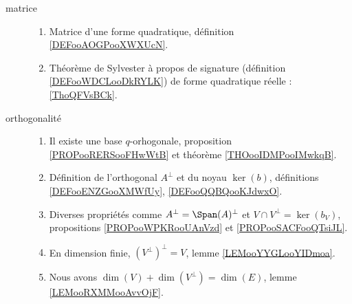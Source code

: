 \begin{description}
	\item[matrice]\hspace{1cm}
	\begin{enumerate}
		\item
		      Matrice d'une forme quadratique, définition \ref{DEFooAOGPooXWXUcN}.
		\item
		      Théorème de Sylvester à propos de signature (définition \ref{DEFooWDCLooDkRYLK}) de forme quadratique réelle : \ref{ThoQFVsBCk}.
	\end{enumerate}
	\item[orthogonalité]\hspace{1cm}
	\begin{enumerate}
		\item
		      Il existe une base \( q\)-orhogonale, proposition \ref{PROPooRERSooFHwWtB} et théorème \ref{THOooIDMPooIMwkqB}.
		\item
		      Définition de l'orthogonal \( A^{\perp}\) et du noyau \( \ker(b)\), définitions \ref{DEFooENZGooXMWfUy}, \ref{DEFooQQBQooKJdwxO}.
		\item
		      Diverses propriétés comme \( A^{\perp}=\Span(A)^{\perp}\) et \( V\cap V^{\perp}=\ker(b_V)\), propositions \ref{PROPooWPKRooUAnVzd} et \ref{PROPooSACFooQTsiJL}.
		\item
		      En dimension finie, \( (V^{\perp})^{\perp}=V\), lemme \ref{LEMooYYGLooYIDmoa}.
		\item
		      Nous avons \( \dim(V)+\dim(V^{\perp})=\dim(E)\), lemme \ref{LEMooRXMMooAvvOjF}.
	\end{enumerate}
\end{description}
